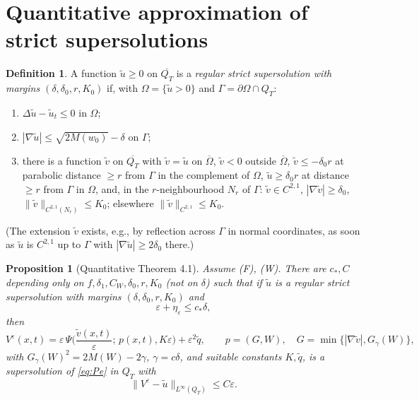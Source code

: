 \documentclass[11pt]{amsart}
\newtheorem{proposition}[theorem]{Proposition}
\theoremstyle{definition}
\newtheorem{definition}[theorem]{Definition}
\theoremstyle{remark}
\newcommand{\ve}{\varepsilon}
\begin{document}
\section{Quantitative approximation of strict supersolutions}

\begin{definition}
A function $\tilde u\ge0$ on $\overline{Q_T}$ is a \emph{regular strict
supersolution with margins $(\delta,\delta_0,r,K_0)$} if, with
$\Omega=\{\tilde u>0\}$ and $\Gamma=\partial\Omega\cap Q_T$:
\begin{enumerate}
\item $\Delta\tilde u-\tilde u_t\le0$ in $\Omega$;
\item $|\nabla\tilde u|\le\sqrt{2M(w_0)}-\delta$ on $\Gamma$;
\item there is a function $\tilde v$ on $\overline{Q_T}$ with $\tilde v=\tilde u$ on
$\overline\Omega$, $\tilde v<0$ outside $\overline\Omega$, $\tilde v\le-\delta_0r$ at
parabolic distance $\ge r$ from $\Gamma$ in the complement of $\Omega$,
$\tilde u\ge\delta_0 r$ at distance $\ge r$ from $\Gamma$ in $\Omega$, and, in the
$r$-neighbourhood $N_r$ of $\Gamma$: $\tilde v\in C^{2,1}$, $|\nabla\tilde v|\ge\delta_0$,
$\|\tilde v\|_{C^{2,1}(N_r)}\le K_0$; elsewhere $\|\tilde v\|_{C^{2,1}}\le K_0$.
\end{enumerate}
(The extension $\tilde v$ exists, e.g., by reflection across $\Gamma$ in normal
coordinates, as soon as $\tilde u$ is $C^{2,1}$ up to $\Gamma$ with
$|\nabla\tilde u|\ge2\delta_0$ there.)
\end{definition}

\begin{proposition}[Quantitative Theorem 4.1]\label{prop:super}
Assume (F), (W). There are $c_*,C$ depending only on $f,\delta_1,C_W,\delta_0,r,K_0$
(\emph{not} on $\delta$) such that if $\tilde u$ is a regular strict
supersolution with margins $(\delta,\delta_0,r,K_0)$ and
\[
\ve+\eta_\ve\le c_*\delta,
\]
then
\[
V^\ve(x,t)=\ve\,\Psi\Big(\frac{\tilde v(x,t)}\ve;\,p(x,t),K\ve\Big)+\ve^2\tilde q,\qquad
p=(G,W),\quad G=\min\{|\nabla\tilde v|,G_\gamma(W)\},
\]
with $G_\gamma(W)^2=2M(W)-2\gamma$, $\gamma=c\delta$, and suitable constants
$K,\tilde q$, is a supersolution of \eqref{eq:Pe} in $Q_T$ with
\[
\|V^\ve-\tilde u\|_{L^\infty(Q_T)}\le C\ve .
\]
\end{proposition}
\end{document}
